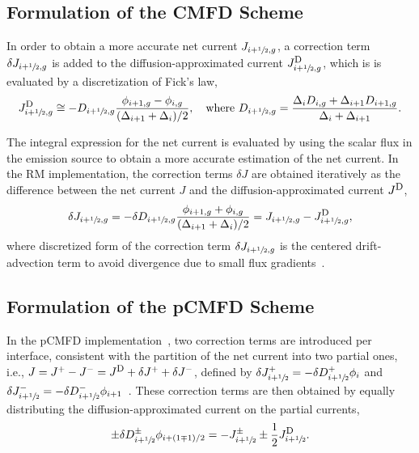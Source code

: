\documentclass[letterpaper]{mc2021}
\newcommand{\hzi}{\ensuremath{\sfrac{1}{2}}}
\newcommand{\jD}{\ensuremath{J^{\textrm{\scriptsize{D}}}}}
\newcommand{\jp}{\ensuremath{J^+}}
\newcommand{\jm}{\ensuremath{J^-}}
\begin{document}
\vspace{-1.5mm}

\subsection{Formulation of the CMFD Scheme} 
\label{sec:cmfd}

In order to obtain a more accurate net current $J_{i+\hzi,g}$, a correction term $\delta J_{i+\hzi,g}$ is added to the diffusion-approximated current $\jD_{i+\hzi,g}$, which is is evaluated by a discretization of Fick's law, 
\begin{equation}
\label{eq:JD}
\jD_{i+\hzi,g} \cong - D_{i+\hzi,g}
\frac{\phi_{i+1,g} - \phi_{i,g}}{(\Delta_{i+1} + \Delta_i)/2},
\quad \text{where }
D_{i+\hzi,g} = \frac{\Delta_i D_{i,g} + \Delta_{i+1} D_{i+1,g}}
{\Delta_i + \Delta_{i+1}}.
\end{equation}

\vspace{-2.5mm}

The integral expression for the net current is evaluated by using the scalar flux in the emission source to obtain a more accurate estimation of the net current. In the RM implementation, the correction terms $\delta J$ are obtained  iteratively as the difference between the net current $J$ and the diffusion-approximated current $\jD$, 
\begin{equation}
\label{eq:dJ}
\delta J_{i+\hzi,g} = -\delta D_{i+\hzi,g}
\frac{\phi_{i+1,g} + \phi_{i,g}}{(\Delta_{i+1} + \Delta_i)/2} =
J_{i+\hzi,g} - \jD_{i+\hzi,g},
\end{equation}
where discretized form of the correction term $\delta J_{i+\hzi,g}$ is the centered drift-advection term to avoid divergence due to small flux gradients~\cite{Tomatis-2011,Smith-1983}.

\vspace{-2.5mm}

\subsection{Formulation of the pCMFD Scheme} 
\label{sec:pcmfd}

In the pCMFD implementation~\cite{Cho-2003}, two correction terms are introduced per interface, consistent with the partition of the net current into two partial ones, i.e., $J = \jp - \jm = \jD + \delta J^+ + \delta J^-$, defined by $\delta \jp _{i+\hzi} = -\delta D^+ _{i+\hzi} \phi_i$ and $\delta \jm _{i+\hzi} = -\delta D^- _{i+\hzi} \phi_{i+1}$~\cite{Jarrett-2016,Zhu-2016}. These correction terms are then obtained by equally distributing the diffusion-approximated current on the partial currents,
\begin{equation}
\label{eq:delta-D-pCMFD}
\pm \delta D^{\pm} _{i+\hzi} \phi_{i+(1\mp 1)/2} = 
- J^\pm_{i+\hzi} \pm \frac{1}{2}\jD_{i+\hzi} .
\end{equation}
\end{document}
